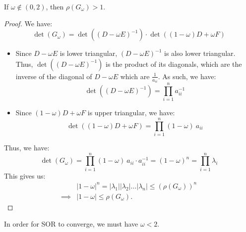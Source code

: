 \documentclass[../main/main.tex]{subfiles}
\begin{document}
\begin{theorem}
If $\omega \not\in(0,2)$, then $\rho(G_{\omega})>1$.
\end{theorem}
\begin{proof}
  We have:
  \[
    \det(G_{\omega}) = \det((D-\omega E)^{-1}) \cdot \det((1-\omega)D +\omega F)
  \]
\begin{itemize}
        \item
  Since $D-\omega E$ is lower triangular, $(D-\omega E)^{-1}$ is also lower triangular. Thus, $\det((D-\omega E)^{-1})$ is the product of its diagonals, which are the inverse of the diagonal of $D-\omega E$ which are $\frac{1}{a_{i i}}$. As such, we have: \[
    \det ((D-\omega E)^{-1}) = \prod_{i=1}^n a_{ii}^{-1}
        \]
  \item Since $(1-\omega)D +\omega F$ is upper triangular, we have: \[
        \det ((1-\omega)D +\omega F) = \prod_{i=1}^n (1-\omega)~a_{ii}
        \]
\end{itemize}
Thus, we have: \[
  \det (G_{\omega}) = \prod_{i=1}^n (1-\omega)~a_{ii} \cdot a_{ii}^{-1} = (1-\omega)^{n} = \prod_{i=1}^n \lambda_{i}
\]
This gives us:
\begin{align*}
  & |1-\omega|^{n} = | \lambda_{1}|| \lambda_{2}|\ldots| \lambda_{n}| \leq (\rho(G_{\omega}))^{n} \\
  \implies & |1-\omega| \leq \rho(G_{\omega})
  .\end{align*}
\end{proof}
\begin{corollary}
In order for SOR to converge, we must have $\omega < 2$.
\end{corollary}
\end{document}
